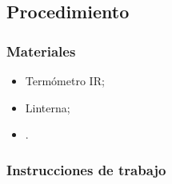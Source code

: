 \subsection{Procedimiento}

\subsubsection{Materiales}
\begin{itemize}
	\item Termómetro IR;\@
	\item Linterna;\@
	\item \Oent.
\end{itemize}

\subsubsection{Instrucciones de trabajo}


